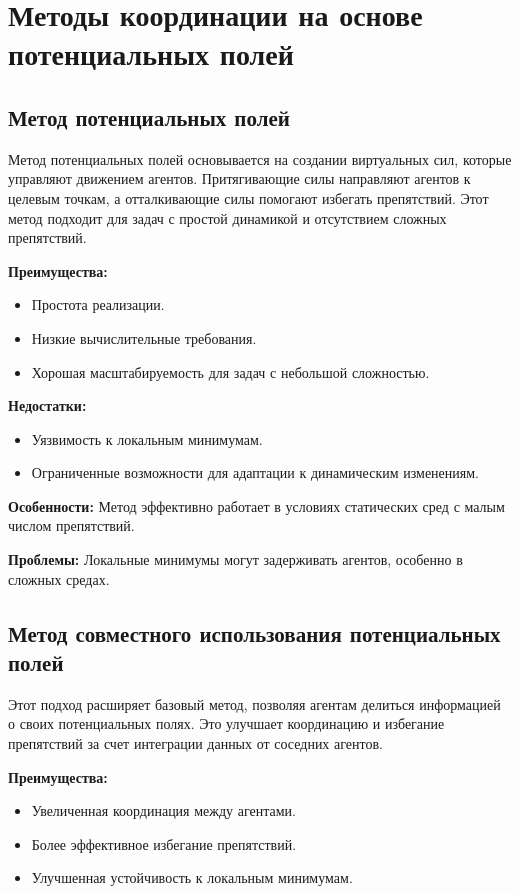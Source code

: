 \iffalse
\section{Методы координации на основе потенциальных полей}

\subsection{Метод потенциальных полей}
Метод потенциальных полей основывается на создании виртуальных сил, которые управляют движением агентов. Притягивающие силы направляют агентов к целевым точкам, а отталкивающие силы помогают избегать препятствий. Этот метод подходит для задач с простой динамикой и отсутствием сложных препятствий.

\textbf{Преимущества:}
\begin{itemize}
	\item Простота реализации.
	\item Низкие вычислительные требования.
	\item Хорошая масштабируемость для задач с небольшой сложностью.
\end{itemize}

\textbf{Недостатки:}
\begin{itemize}
	\item Уязвимость к локальным минимумам.
	\item Ограниченные возможности для адаптации к динамическим изменениям.
\end{itemize}

\textbf{Особенности:} Метод эффективно работает в условиях статических сред с малым числом препятствий.

\textbf{Проблемы:} Локальные минимумы могут задерживать агентов, особенно в сложных средах.

\subsection{Метод совместного использования потенциальных полей}
Этот подход расширяет базовый метод, позволяя агентам делиться информацией о своих потенциальных полях. Это улучшает координацию и избегание препятствий за счет интеграции данных от соседних агентов.

\textbf{Преимущества:}
\begin{itemize}
	\item Увеличенная координация между агентами.
	\item Более эффективное избегание препятствий.
	\item Улучшенная устойчивость к локальным минимумам.
\end{itemize}

